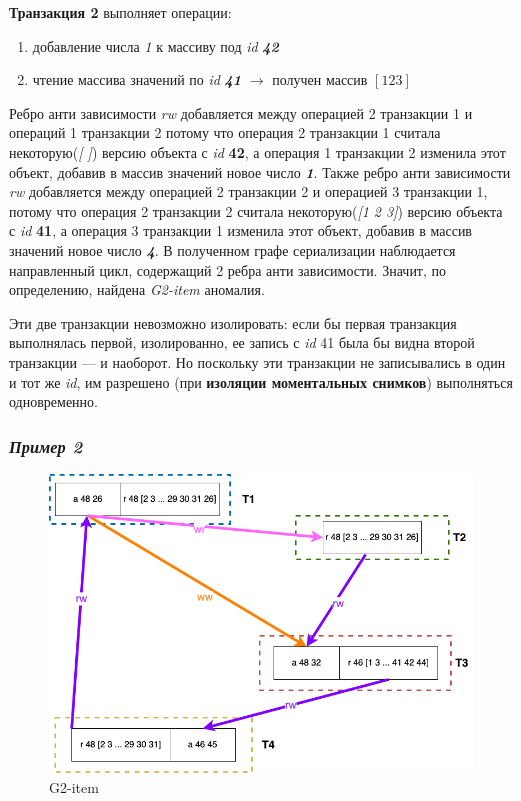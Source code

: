 \documentclass[14pt,  openany]{book}
\begin{document}
\textbf{Транзакция 2} выполняет операции:
\begin{enumerate}
\item добавление числа \textit{1} к массиву под \textit{id} \textit{\textbf{42}}
\item чтение массива значений по \textit{id} \textit{\textbf{41}} $\rightarrow$ получен массив $[1 2 3]$
\end{enumerate}

Ребро анти зависимости \textit{rw} добавляется между операцией 2 транзакции 1 и операций 1 транзакции 2 потому что операция 2 транзакции 1  считала некоторую(\textit{[ ]}) версию объекта с \textit{id} \textbf{42},  а операция 1 транзакции 2 изменила этот объект, добавив в массив значений новое число \textit{\textbf{1}}.  Также ребро анти зависимости \textit{rw} добавляется между операцией 2 транзакции 2 и операцией 3 транзакции 1, потому что операция 2 транзакции 2  считала некоторую(\textit{[1 2 3]}) версию объекта с \textit{id} \textbf{41},  а операция 3 транзакции 1 изменила этот объект, добавив в массив значений новое число \textit{\textbf{4}}.  В полученном графе сериализации наблюдается направленный цикл, содержащий 2 ребра анти зависимости. Значит, по определению, найдена \textit{G2-item} аномалия.

\par Эти две транзакции невозможно изолировать: если бы первая транзакция выполнялась первой, изолированно, ее запись с \textit{id} 41 была бы видна второй транзакции --- и наоборот. Но поскольку эти транзакции не записывались в один и тот же \textit{id}, им разрешено (при \textbf{изоляции моментальных снимков}) выполняться одновременно.

\subsubsection{\textit{Пример 2}}
\begin{figure}[H]
  \includegraphics[width=\textwidth]{images/g2item2.png}
  \caption{G2-item}
\end{figure}
\end{document}
